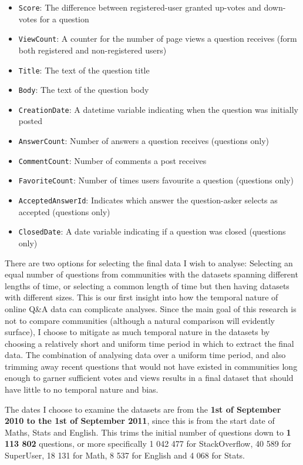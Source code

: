 \documentclass[11pt,preprint, authoryear]{article}
\numberwithin{equation}{section}
\begin{document}
\begin{itemize}
\item
  \texttt{Score}: The difference between registered-user granted
  up-votes and down-votes for a question
\item
  \texttt{ViewCount}: A counter for the number of page views a question
  receives (form both registered and non-registered users)
\item
  \texttt{Title}: The text of the question title
\item
  \texttt{Body}: The text of the question body
\item
  \texttt{CreationDate}: A datetime variable indicating when the
  question was initially posted
\item
  \texttt{AnswerCount}: Number of answers a question receives (questions
  only)
\item
  \texttt{CommentCount}: Number of comments a post receives
\item
  \texttt{FavoriteCount}: Number of times users favourite a question
  (questions only)
\item
  \texttt{AcceptedAnswerId}: Indicates which answer the question-asker
  selects as accepted (questions only)
\item
  \texttt{ClosedDate}: A date variable indicating if a question was
  closed (questions only)
\end{itemize}


There are two options for selecting the final data I wish to analyse:
Selecting an equal number of questions from communities with the
datasets spanning different lengths of time, or selecting a common
length of time but then having datasets with different sizes. This is
our first insight into how the temporal nature of online Q\&A data can
complicate analyses. Since the main goal of this research is not to
compare communities (although a natural comparison will evidently
surface), I choose to mitigate as much temporal nature in the datasets
by choosing a relatively short and uniform time period in which to
extract the final data. The combination of analysing data over a uniform
time period, and also trimming away recent questions that would not have
existed in communities long enough to garner sufficient votes and views
results in a final dataset that should have little to no temporal nature
and bias.

The dates I choose to examine the datasets are from the \textbf{1st of
September 2010 to the 1st of September 2011}, since this is from the
start date of Maths, Stats and English. This trims the initial number of
questions down to \textbf{1 113 802} questions, or more specifically 1
042 477 for StackOverflow, 40 589 for SuperUser, 18 131 for Math, 8 537
for English and 4 068 for Stats.
\end{document}
